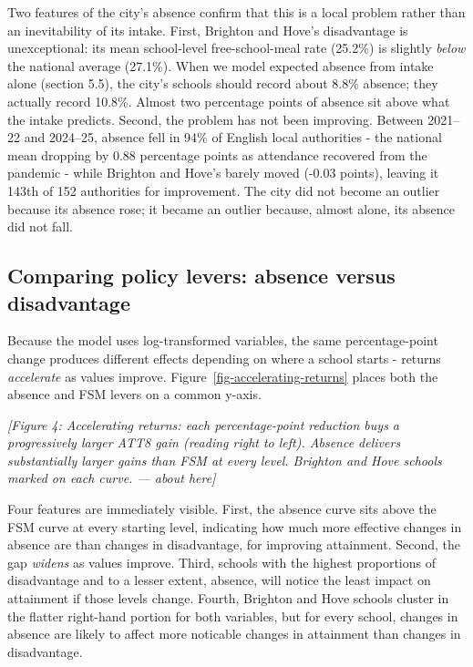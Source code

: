 \documentclass[
  12pt,
  titlepage]{article}
\begin{document}
Two features of the city's absence confirm that this is a local problem
rather than an inevitability of its intake. First, Brighton and Hove's
disadvantage is unexceptional: its mean school-level free-school-meal
rate (25.2\%) is slightly \emph{below} the national average (27.1\%).
When we model expected absence from intake alone (section 5.5), the
city's schools should record about 8.8\% absence; they actually record
10.8\%. Almost two percentage points of absence sit above what the
intake predicts. Second, the problem has not been improving. Between
2021--22 and 2024--25, absence fell in 94\% of English local authorities
- the national mean dropping by 0.88 percentage points as attendance
recovered from the pandemic - while Brighton and Hove's barely moved
(-0.03 points), leaving it 143th of 152 authorities for improvement. The
city did not become an outlier because its absence rose; it became an
outlier because, almost alone, its absence did not fall.

\subsection{Comparing policy levers: absence versus
disadvantage}\label{comparing-policy-levers-absence-versus-disadvantage}

Because the model uses log-transformed variables, the same
percentage-point change produces different effects depending on where a
school starts - returns \emph{accelerate} as values improve.
Figure~\ref{fig-accelerating-returns} places both the absence and FSM
levers on a common y-axis.

\emph{{[}Figure 4: Accelerating returns: each percentage-point reduction
buys a progressively larger ATT8 gain (reading right to left). Absence
delivers substantially larger gains than FSM at every level. Brighton
and Hove schools marked on each curve. --- about here{]}}

Four features are immediately visible. First, the absence curve sits
above the FSM curve at every starting level, indicating how much more
effective changes in absence are than changes in disadvantage, for
improving attainment. Second, the gap \emph{widens} as values improve.
Third, schools with the highest proportions of disadvantage and to a
lesser extent, absence, will notice the least impact on attainment if
those levels change. Fourth, Brighton and Hove schools cluster in the
flatter right-hand portion for both variables, but for every school,
changes in absence are likely to affect more noticable changes in
attainment than changes in disadvantage.
\end{document}
